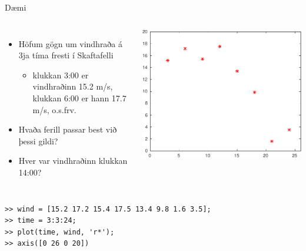 \documentclass{beamer}
\begin{document}
\begin{frame}[fragile]{Dæmi}
\begin{columns}
\small
{}
\begin{itemize}
 \item Höfum gögn um vindhraða á 3ja tíma fresti í Skaftafelli 
 \begin{itemize}
  \item klukkan 3:00 er vindhraðinn 15.2 m/s, klukkan 6:00 er hann 17.7 m/s, o.s.frv.
 \end{itemize}
 \item Hvaða ferill passar best við þessi gildi?
 \item Hver var vindhraðinn klukkan 14:00?
\end{itemize}
\includegraphics[width=\linewidth]{Pics/vindur}
\end{columns}
\begin{verbatim}
>> wind = [15.2 17.2 15.4 17.5 13.4 9.8 1.6 3.5];
>> time = 3:3:24;
>> plot(time, wind, 'r*'); 
>> axis([0 26 0 20])
\end{verbatim}
\end{frame}
\end{document}
